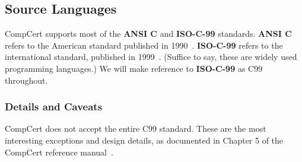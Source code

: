 \subsection{Source Languages}

CompCert supports most of the {\bf ANSI C} and {\bf ISO-C-99} standards.
{\bf ANSI C} refers to the American standard published in 1990~\cite{ansi-c}.
{\bf ISO-C-99} refers to the international standard, published in 1999~\cite{iso-c99}.
(Suffice to say, these are widely used programming languages.)
We will make reference to {\bf ISO-C-99} as C99 throughout.

\subsubsection{Details and Caveats}
CompCert does not accept the entire C99 standard.
These are the most interesting exceptions and design details, as documented in Chapter 5 of the CompCert reference manual~\cite{refman}.

